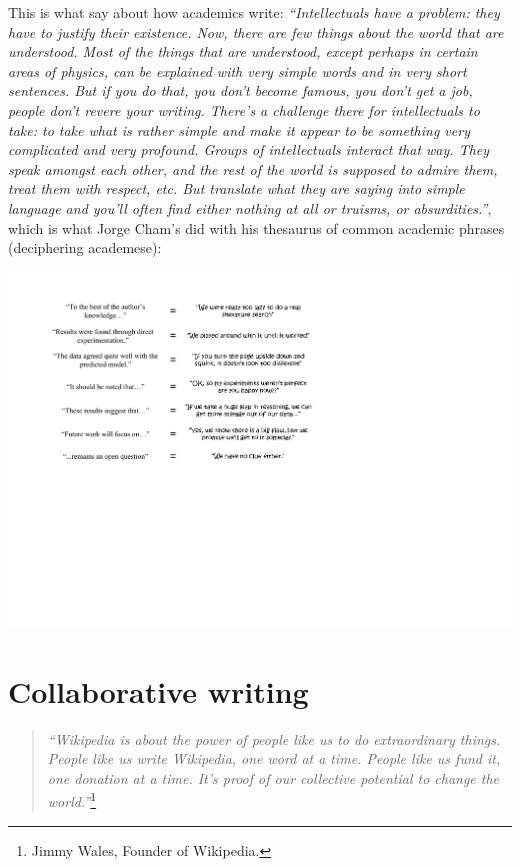 \documentclass[graybox,envcountchap,sectrefs,UStrade]{svmono}
\begin{document}
This is what \citet[pp.45--46]{Chomsky2002entretiens} say about how academics write: \emph{``Intellectuals have a problem: they have to justify their existence. Now, there are few things about the world that are understood. Most of the things that are understood, except perhaps in certain areas of physics, can be explained with very simple words and in very short sentences. But if you do that, you don't become famous, you don't get a job, people don't revere your writing. There's a challenge there for intellectuals to take: to take what is rather simple and make it appear to be something very complicated and very profound. Groups of intellectuals interact that way. They speak amongst each other, and the rest of the world is supposed to admire them, treat them with respect, etc. But translate what they are saying into simple language and you'll often find either nothing at all or truisms, or absurdities.''}, which is what Jorge Cham's did with his thesaurus of common academic phrases (deciphering academese):

\begin{flushleft}
\includegraphics[width=\textwidth]{Fig_academese.pdf}
\end{flushleft}


\section{Collaborative writing}

\begin{quote}
    \emph{``Wikipedia is about the power of people like us to do extraordinary things. People like us write Wikipedia, one word at a time. People like us fund it, one donation at a time. It's proof of our collective potential to change the world.''}\footnote{Jimmy Wales, Founder of Wikipedia.}
\end{quote}
\end{document}
